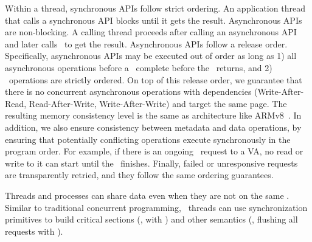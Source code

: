 Within a thread, synchronous APIs follow strict ordering.
An application thread that calls a synchronous API blocks until it gets the result.
Asynchronous APIs are non-blocking. A calling thread proceeds after calling an asynchronous API and later calls \poll\ to get the result. 
Asynchronous APIs follow a release order.
Specifically, asynchronous APIs may be executed out of order as long as
1) all asynchronous operations before a \release\ complete before the \release\ returns,
and 2) \release\ operations are strictly ordered.
On top of this release order, 
we guarantee that there is no concurrent asynchronous operations with dependencies (Write-After-Read, Read-After-Write, Write-After-Write) and target the same page.
The resulting memory consistency level is the same as architecture like ARMv8~\cite{ARMv8}.
In addition, we also ensure consistency between metadata and data operations, by ensuring that potentially conflicting operations execute synchronously in the program order. For example, if there is an ongoing \sysfree\ request to a VA, no read or write to it can start until the \sysfree\ finishes.
Finally, failed or unresponsive requests are transparently retried, and they follow the same ordering guarantees.






Threads and processes can share data even when they are not on the same \CN.
Similar to traditional concurrent programming, \sys\ threads can use synchronization primitives to build critical sections (\eg, with \syslock) 
and other semantics (\eg, flushing all requests with \fence).

